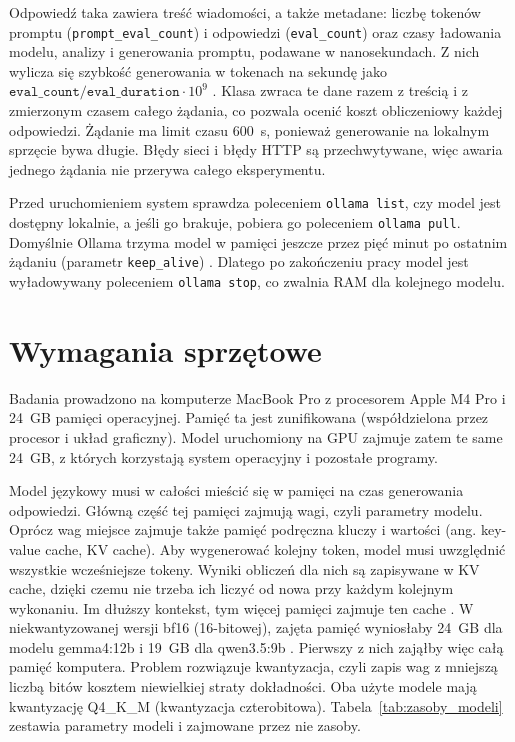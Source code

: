 Odpowiedź taka zawiera treść wiadomości, a także metadane: liczbę tokenów promptu (\texttt{prompt\_eval\_count}) i odpowiedzi (\texttt{eval\_count}) oraz czasy ładowania modelu, analizy i generowania promptu, podawane w nanosekundach. Z nich wylicza się szybkość generowania w tokenach na sekundę jako $\texttt{eval\_count} / \texttt{eval\_duration} \cdot 10^{9}$ \cite{ollama_api_reference}. Klasa zwraca te dane razem z treścią i z zmierzonym czasem całego żądania, co pozwala ocenić koszt obliczeniowy każdej odpowiedzi. Żądanie ma limit czasu 600~s, ponieważ generowanie na lokalnym sprzęcie bywa długie. Błędy sieci i błędy HTTP są przechwytywane, więc awaria jednego żądania nie przerywa całego eksperymentu.

Przed uruchomieniem system sprawdza poleceniem \texttt{ollama list}, czy model jest dostępny lokalnie, a jeśli go brakuje, pobiera go poleceniem \texttt{ollama pull}. Domyślnie Ollama trzyma model w pamięci jeszcze przez pięć minut po ostatnim żądaniu (parametr \texttt{keep\_alive}) \cite{ollama_api_reference}. Dlatego po zakończeniu pracy model jest wyładowywany poleceniem \texttt{ollama stop}, co zwalnia RAM dla kolejnego modelu.

\section{Wymagania sprzętowe}
\label{sec:wymagania-sprzetowe}

Badania prowadzono na komputerze MacBook Pro z procesorem Apple M4 Pro i 24~GB pamięci operacyjnej. Pamięć ta jest zunifikowana (współdzielona przez procesor i układ graficzny). Model uruchomiony na GPU zajmuje zatem te same 24~GB, z których korzystają system operacyjny i pozostałe programy.

Model językowy musi w całości mieścić się w pamięci na czas generowania odpowiedzi. Główną część tej pamięci zajmują wagi, czyli parametry modelu. Oprócz wag miejsce zajmuje także pamięć podręczna kluczy i wartości (ang. key-value cache, KV cache). Aby wygenerować kolejny token, model musi uwzględnić wszystkie wcześniejsze tokeny. Wyniki obliczeń dla nich są zapisywane w KV cache, dzięki czemu nie trzeba ich liczyć od nowa przy każdym kolejnym wykonaniu. Im dłuższy kontekst, tym więcej pamięci zajmuje ten cache \cite{ollama_faq}. W niekwantyzowanej wersji bf16 (16-bitowej), zajęta pamięć wyniosłaby 24~GB dla modelu gemma4:12b \cite{ollama_library_gemma4} i 19~GB dla qwen3.5:9b \cite{ollama_library_qwen35}. Pierwszy z nich zająłby więc całą pamięć komputera. Problem rozwiązuje kwantyzacja, czyli zapis wag z mniejszą liczbą bitów kosztem niewielkiej straty dokładności. Oba użyte modele mają kwantyzację Q4\_K\_M (kwantyzacja czterobitowa). Tabela~\ref{tab:zasoby_modeli} zestawia parametry modeli i zajmowane przez nie zasoby.

